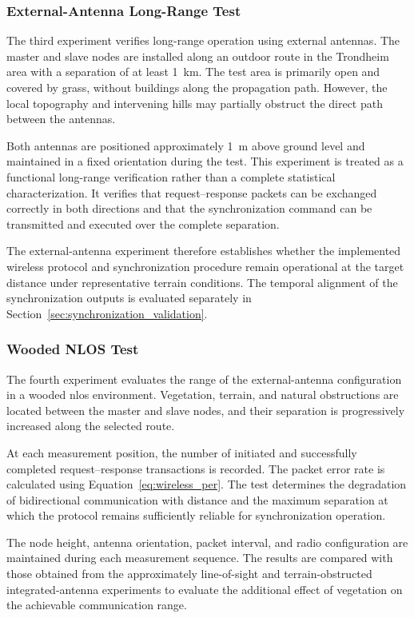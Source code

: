 \subsubsection{External-Antenna Long-Range Test}

The third experiment verifies long-range operation using external antennas. The master and slave nodes are installed along an outdoor route in the Trondheim area with a separation of at least 1~km. The test area is primarily open and covered by grass, without buildings along the propagation path. However, the local topography and intervening hills may partially obstruct the direct path between the antennas.

Both antennas are positioned approximately 1~m above ground level and maintained in a fixed orientation during the test. This experiment is treated as a functional long-range verification rather than a complete statistical characterization. It verifies that request--response packets can be exchanged correctly in both directions and that the synchronization command can be transmitted and executed over the complete separation.

The external-antenna experiment therefore establishes whether the implemented wireless protocol and synchronization procedure remain operational at the target distance under representative terrain conditions. The temporal alignment of the synchronization outputs is evaluated separately in Section~\ref{sec:synchronization_validation}.

\subsubsection{Wooded NLOS Test}

The fourth experiment evaluates the range of the external-antenna configuration in a wooded \acrshort{nlos} environment. Vegetation, terrain, and natural obstructions are located between the master and slave nodes, and their separation is progressively increased along the selected route.

At each measurement position, the number of initiated and successfully completed request--response transactions is recorded. The packet error rate is calculated using Equation~\ref{eq:wireless_per}. The test determines the degradation of bidirectional communication with distance and the maximum separation at which the protocol remains sufficiently reliable for synchronization operation.

The node height, antenna orientation, packet interval, and radio configuration are maintained during each measurement sequence. The results are compared with those obtained from the approximately line-of-sight and terrain-obstructed integrated-antenna experiments to evaluate the additional effect of vegetation on the achievable communication range.

